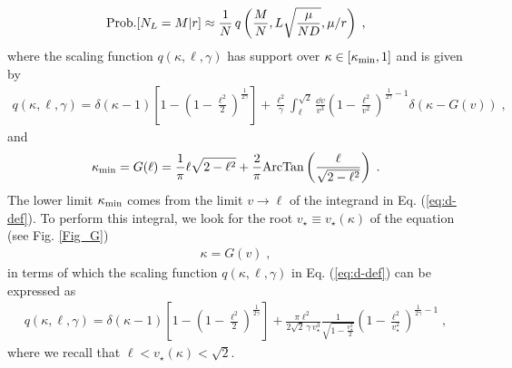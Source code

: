 \documentclass[onecolumn,superscriptaddress,
 amsmath,amssymb,
 aps,
 prd,
]{revtex4-1}
\newcommand{\bea}{\begin{eqnarray}}
\newcommand{\eea}{\end{eqnarray}}
\begin{document}
\begin{equation} \label{eq:fcs-scaling}
{\rm Prob.}[N_L =M | r] \approx \frac{1}{N} \, q\left( \frac{M}{N}, L \sqrt{\frac{\mu}{N D}}, \mu/r \right) \;,
\end{equation}
where the scaling function $q(\kappa, \ell, \gamma)$ has support over $\kappa \in [\kappa_{\rm min}, 1]$ and is given by
\begin{align} 
q(\kappa, \ell, \gamma) = \delta(\kappa - 1) \left[1 - \left(1 - \frac{\ell^2}{2}\right)^{\frac{1}{2 \gamma}}\right] + \frac{\ell^2}{\gamma} \int_{\ell}^{\sqrt{2}} \frac{\dd v}{v^3} \left(1 - \frac{\ell^2}{v^2} \right)^{\frac{1}{2\gamma}-1} \delta\left( \kappa - G(v)\right)\;, \label{eq:d-def}
\end{align}
and
\begin{equation}\label{eq:def-zmin}
\kappa_{\rm min} = G(\ell) =\frac{1}{\pi} \ell \sqrt{2 - \ell^2} + \frac{2}{\pi} {\rm ArcTan}\left(\frac{\ell}{\sqrt{2 - \ell^2}}\right) \;.
\end{equation}
The lower limit $\kappa_{\rm min}$ comes from the limit $v \to \ell$ of the integrand in Eq. (\ref{eq:d-def}). To perform this integral, we look for the root $v_{\star} \equiv v_{\star}(\kappa)$ of the equation (see Fig. \ref{Fig_G})
\bea \label{eq:v-eq}
\kappa = G(v) \;,
\eea
in terms of which the scaling function $q(\kappa, \ell, \gamma)$ in Eq. (\ref{eq:d-def}) can be expressed as
\begin{align} \label{eq:d-def-2}
q(\kappa, \ell, \gamma) = \delta(\kappa - 1) \left[1 - \left(1 - \frac{\ell^2}{2}\right)^{\frac{1}{2 \gamma}}\right] + \frac{\pi \ell^2}{2 \sqrt{2} \, \gamma \, v_{\star}^3} \frac{1}{\sqrt{1-\frac{v_{\star}^2}{2}}} \left(1 - \frac{\ell^2}{v_{\star}^2} \right)^{\frac{1}{2 \gamma}-1} \;,
\end{align}
where we recall that $\ell < v_{\star}(\kappa) < \sqrt{2}$. 
\end{document}
